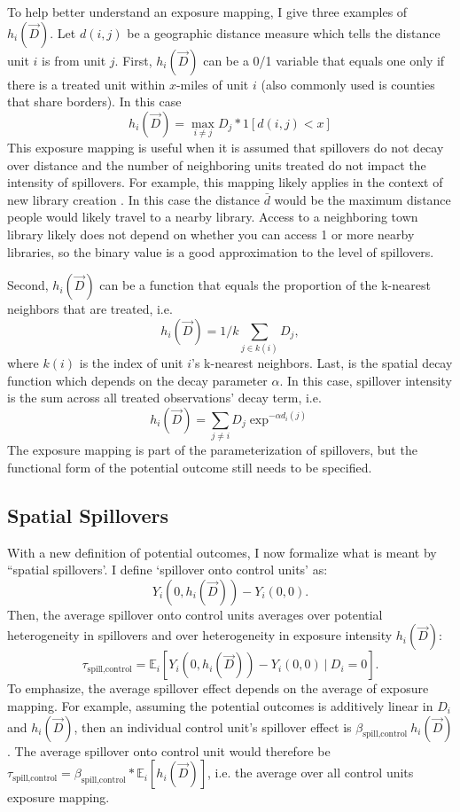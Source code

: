 \documentclass[11pt]{article}
\begin{document}
To help better understand an exposure mapping, I give three examples of $h_i(\vec{D})$. Let $d(i,j)$ be a geographic distance measure which tells the distance unit $i$ is from unit $j$. First, $h_i(\vec{D})$ can be a 0/1 variable that equals one only if there is a treated unit within $x$-miles of unit $i$ (also commonly used is counties that share borders). In this case \[
    h_i(\vec{D}) = \max_{i \neq j} D_j * 1[ d(i,j) < x ] 
\] 
This exposure mapping is useful when it is assumed that spillovers do not decay over distance and the number of neighboring units treated do not impact the intensity of spillovers. For example, this mapping likely applies in the context of new library creation \citep{Berkes_Nencka_2020}. In this case the distance $\bar{d}$ would be the maximum distance people would likely travel to a nearby library. Access to a neighboring town library likely does not depend on whether you can access 1 or more nearby libraries, so the binary value is a good approximation to the level of spillovers.  

Second, $h_i(\vec{D})$ can be a function that equals the proportion of the k-nearest neighbors that are treated, i.e. \[
    h_i(\vec{D}) = 1/k \sum_{j \in k(i)} D_j,
\]
where $k(i)$ is the index of unit $i$'s k-nearest neighbors. Last, is the spatial decay function which depends on  the decay parameter $\alpha$. In this case, spillover intensity is the sum across all treated observations' decay term, i.e. \[ 
    h_i(\vec{D}) = \sum_{j \neq i} D_j \exp^{-\alpha d_i(j)}
\] 
The exposure mapping is part of the parameterization of spillovers, but the functional form of the potential outcome still needs to be specified. 



\subsection{Spatial Spillovers}

With a new definition of potential outcomes, I now formalize what is meant by ``spatial spillovers'. I define `spillover onto control units' as: \[
    Y_{i}(0, h_i(\vec{D})) - Y_{i}(0, 0).
\] 
Then, the average spillover onto control units averages over potential heterogeneity in spillovers and over heterogeneity in exposure intensity $h_i(\vec{D})$: \[
    \tau_{\text{spill,control}} = \mathbb{E}_i \left[ Y_{i}(0, h_i(\vec{D})) - Y_{i}(0, 0) \ \vert \ D_i = 0 \right].
\]
To emphasize, the average spillover effect depends on the average of exposure mapping. For example, assuming the potential outcomes is additively linear in $D_i$ and $h_i(\vec{D})$, then an individual control unit's spillover effect is $\beta_{\text{spill,control}} \ h_i(\vec{D})$. The average spillover onto control unit would therefore be $\tau_{\text{spill,control}} = \beta_{\text{spill,control}} * \mathbb{E}_{i} \left[ h_i(\vec{D})\right]$, i.e. the average over all control units exposure mapping.
\end{document}
